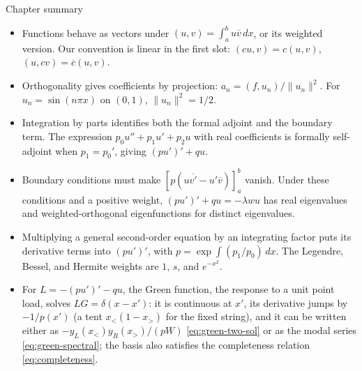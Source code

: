 \documentclass[11pt]{beamer}
\begin{document}
\begin{frame}[allowframebreaks=0.98]{Chapter summary}
\footnotesize

\begin{itemize}
 \item Functions behave as vectors under $(u,v)=\int_a^b u\overline v\,dx$,
 or its weighted version. Our convention is linear in the first slot:
 $(cu,v)=c(u,v)$, $(u,cv)=\overline c(u,v)$.
 \item Orthogonality gives coefficients by projection:
 $a_n=(f,u_n)/\|u_n\|^2$. For $u_n=\sin(n\pi x)$ on $(0,1)$,
 $\|u_n\|^2=1/2$.
 \item Integration by parts identifies both the formal adjoint and the boundary
 term. The expression $p_0u''+p_1u'+p_2u$ with real coefficients is formally
 self-adjoint when $p_1=p_0'$, giving $(pu')'+qu$.
 \item Boundary conditions must make
 $[p(u\overline{v'}-u'\overline v)]_a^b$ vanish. Under these conditions and
 a positive weight, $(pu')'+qu=-\lambda wu$ has real eigenvalues and
 weighted-orthogonal eigenfunctions for distinct eigenvalues.
 \item Multiplying a general second-order equation by an integrating factor
 puts its derivative terms into $(pu')'$, with
 $p=\exp\int(p_1/p_0)\,dx$. The Legendre, Bessel, and Hermite weights are
 $1$, $s$, and $e^{-x^2}$.
 \item For $L=-(pu')'-qu$, the Green function, the response to a unit point load,
 solves $LG=\delta(x-x')$: it is continuous at $x'$, its derivative jumps by
 $-1/p(x')$ (a tent $x_<(1-x_>)$ for the fixed string), and it can be written
 either as $-y_L(x_<)y_R(x_>)/(pW)$ \eqref{eq:green-two-sol} or as the modal
 series \eqref{eq:green-spectral}; the basis also satisfies the completeness
 relation \eqref{eq:completeness}.
\end{itemize}
\end{frame}
\end{document}
